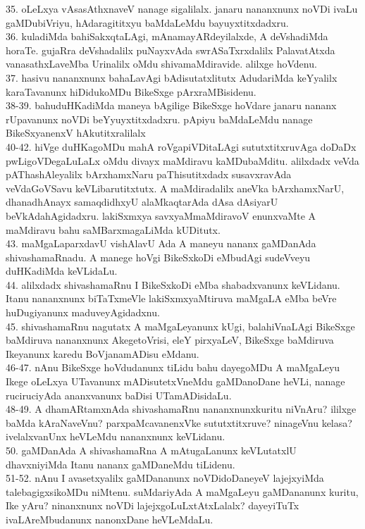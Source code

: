 \documentclass{article}
\begin{document}
35. oLeLxya vAsasAthxnaveV nanage sigalilalx. janaru nananxnunx noVDi ivaLu gaMDubiVriyu, hAdaragititxyu baMdaLeMdu bayuyxtitxdadxru.\\
36. kuladiMda bahiSakxqtaLAgi, mAnamayARdeyilalxde, A deVshadiMda horaTe. gujaRra deVshadalilx puNayxvAda swrASaTxrxdalilx PalavatAtxda vanasathxLaveMba Urinalilx oMdu shivamaMdiravide. alilxge hoVdenu.\\
37. hasivu nananxnunx bahaLavAgi bAdisutatxlitutx AdudariMda keYyalilx karaTavanunx hiDidukoMDu BikeSxge pArxraMBisidenu.\\
38-39. bahuduHKadiMda maneya bAgilige BikeSxge hoVdare janaru nananx rUpavanunx noVDi beYyuyxtitxdadxru. pApiyu baMdaLeMdu nanage BikeSxyanenxV hAkutitxralilalx\\
40-42. hiVge duHKagoMDu mahA roVgapiVDitaLAgi sututxtitxruvAga doDaDx pwLigoVDegaLuLaLx oMdu divayx maMdiravu kaMDubaMditu. alilxdadx veVda pAThashAleyalilx bArxhamxNaru paThisutitxdadx susavxravAda veVdaGoVSavu keVLibarutitxtutx. A maMdiradalilx aneVka bArxhamxNarU, dhanadhAnayx samaqdidhxyU alaMkaqtarAda dAsa dAsiyarU beVkAdahAgidadxru. lakiSxmxya savxyaMmaMdiravoV enunxvaMte A maMdiravu bahu saMBarxmagaLiMda kUDitutx.\\
43. maMgaLaparxdavU vishAlavU Ada A maneyu nananx gaMDanAda shivashamaRnadu. A manege hoVgi BikeSxkoDi eMbudAgi sudeVveyu duHKadiMda keVLidaLu.\\
44. alilxdadx shivashamaRnu I BikeSxkoDi eMba shabadxvanunx keVLidanu. Itanu nananxnunx biTaTxmeVle lakiSxmxyaMtiruva maMgaLA eMba beVre huDugiyanunx maduveyAgidadxnu.\\
45. shivashamaRnu nagutatx A maMgaLeyanunx kUgi, balahiVnaLAgi BikeSxge baMdiruva nananxnunx AkegetoVrisi, eleY pirxyaLeV, BikeSxge baMdiruva Ikeyanunx karedu BoVjanamADisu eMdanu.\\
46-47. nAnu BikeSxge hoVdudanunx tiLidu bahu dayegoMDu A maMgaLeyu Ikege oLeLxya UTavanunx mADisutetxVneMdu gaMDanoDane heVLi, nanage ruciruciyAda ananxvanunx baDisi UTamADisidaLu.\\
48-49. A dhamARtamxnAda shivashamaRnu nananxnunxkuritu niVnAru? ililxge baMda kAraNaveVnu? parxpaMcavanenxVke sututxtitxruve? ninageVnu kelasa? ivelalxvanUnx heVLeMdu nananxnunx keVLidanu.\\
50. gaMDanAda A shivashamaRna A mAtugaLanunx keVLutatxlU dhavxniyiMda Itanu nananx gaMDaneMdu tiLidenu.\\
51-52. nAnu I avasetxyalilx gaMDananunx noVDidoDaneyeV lajejxyiMda talebagigxsikoMDu niMtenu. suMdariyAda A maMgaLeyu gaMDananunx kuritu, Ike yAru? ninanxnunx noVDi lajejxgoLuLxtAtxLalalx? dayeyiTuTx ivaLAreMbudanunx nanonxDane heVLeMdaLu.\\
\end{document}
